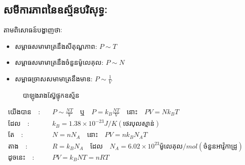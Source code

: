 	 \subsection{សមីការភាពនៃឧស្ម័នបរិសុទ្ធៈ} 
	 	\begin{multicols}{2}
	 	តាមពិសោធន៍បង្ហាញថាៈ
			\begin{itemize}
				\item សម្ពាធសមាមាត្រនឹងសីតុណ្ហភាព: \quad $P\sim T$
				\item សម្ពាធសមាមាត្រនឹងចំនួនម៉ូលេគុល: \quad $P\sim N$
				\item សម្ពាធច្រាសសមាមាត្រនឹងមាឌ: \quad $P\sim\frac{1}{V}$
			\end{itemize}
			\begin{figure}[H]
				\centering
				\caption{បាឡុងរាងស៊្វែផ្ទុកឧស្ម័ន}
			\end{figure}
		\end{multicols}
		\begin{align*}
			\text{យើងបាន}\quad :& \quad P\sim \frac{NT}{V}\quad \text{ឬ}\quad P=k_{B}\frac{NT}{V}\quad \text{នោះ}\quad PV=Nk_{B}T\\\text{ដែល}\quad :&\quad k_{B}=1.38\times10^{-23}J/K\left(\text{ថេរបុលស្មាន់}\right)\\
			\text{តែ}\quad :&\quad N=nN_{A}\quad \text{នោះ}\quad PV=nk_{B}N_{A}T\\
			\text{តាង}\quad :&\quad R=k_{B}N_{A}\quad\text{ដែល}\quad N_{A}=6.02\times10^{23}\text{ម៉ូលេគុល}/mol\left(\text{ចំនួនអាវ៉ូកាដ្រូ}\right)\\
			\text{ដូចនេះ}\quad :&\quad PV=k_{B}NT=nRT
		\end{align*}
